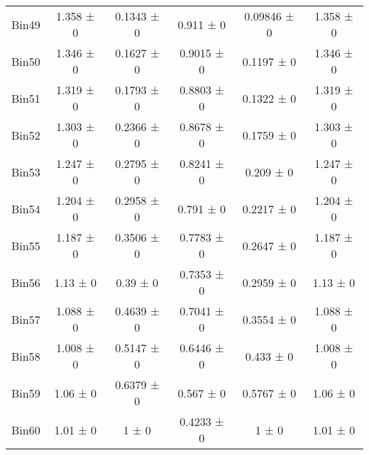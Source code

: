 \begin{tabular}{@{\extracolsep{4pt}}lccccc@{}}
     Bin49 & 1.358 ± 0 & 0.1343 ± 0 & 0.911 ± 0 & 0.09846 ± 0 & 1.358 ± 0 \\ 
     Bin50 & 1.346 ± 0 & 0.1627 ± 0 & 0.9015 ± 0 & 0.1197 ± 0 & 1.346 ± 0 \\ 
     Bin51 & 1.319 ± 0 & 0.1793 ± 0 & 0.8803 ± 0 & 0.1322 ± 0 & 1.319 ± 0 \\ 
     Bin52 & 1.303 ± 0 & 0.2366 ± 0 & 0.8678 ± 0 & 0.1759 ± 0 & 1.303 ± 0 \\ 
     Bin53 & 1.247 ± 0 & 0.2795 ± 0 & 0.8241 ± 0 & 0.209 ± 0 & 1.247 ± 0 \\ 
     Bin54 & 1.204 ± 0 & 0.2958 ± 0 & 0.791 ± 0 & 0.2217 ± 0 & 1.204 ± 0 \\ 
     Bin55 & 1.187 ± 0 & 0.3506 ± 0 & 0.7783 ± 0 & 0.2647 ± 0 & 1.187 ± 0 \\ 
     Bin56 & 1.13 ± 0 & 0.39 ± 0 & 0.7353 ± 0 & 0.2959 ± 0 & 1.13 ± 0 \\ 
     Bin57 & 1.088 ± 0 & 0.4639 ± 0 & 0.7041 ± 0 & 0.3554 ± 0 & 1.088 ± 0 \\ 
     Bin58 & 1.008 ± 0 & 0.5147 ± 0 & 0.6446 ± 0 & 0.433 ± 0 & 1.008 ± 0 \\ 
     Bin59 & 1.06 ± 0 & 0.6379 ± 0 & 0.567 ± 0 & 0.5767 ± 0 & 1.06 ± 0 \\ 
     Bin60 & 1.01 ± 0 & 1 ± 0 & 0.4233 ± 0 & 1 ± 0 & 1.01 ± 0 \\ 
\hline\hline
  \end{tabular}
